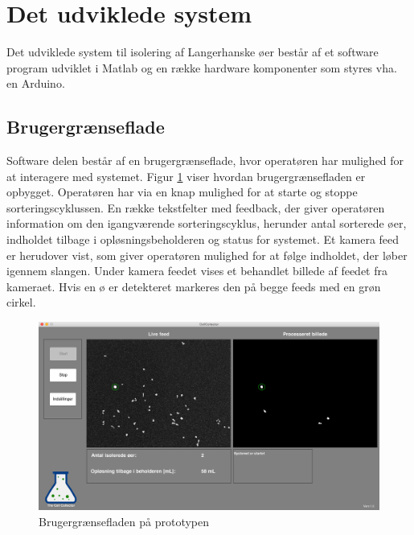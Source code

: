 \section{Det udviklede system}
Det udviklede system til isolering af Langerhanske øer består af et software program udviklet i Matlab og en række hardware komponenter som styres vha. en Arduino.


 
\subsection{Brugergrænseflade} 
Software delen består af en brugergrænseflade, hvor operatøren har mulighed for at interagere med systemet. Figur \ref{fig:finalgui} viser hvordan brugergrænsefladen er opbygget. Operatøren har via en knap mulighed for at starte og stoppe sorteringscyklussen. En række tekstfelter med feedback, der giver operatøren information om den igangværende sorteringscyklus, herunder antal sorterede øer, indholdet tilbage i opløsningsbeholderen og status for systemet. Et kamera feed er herudover vist, som giver operatøren mulighed for at følge indholdet, der løber igennem slangen. Under kamera feedet vises et behandlet billede af feedet fra kameraet. Hvis en ø er detekteret markeres den på begge feeds med en grøn cirkel.

 \begin{figure}[H]
	\centering
	\includegraphics[width=1\textwidth]{billeder/gui_main.png}
	\caption{Brugergrænsefladen på prototypen}
	\label{fig:finalgui}
\end{figure}